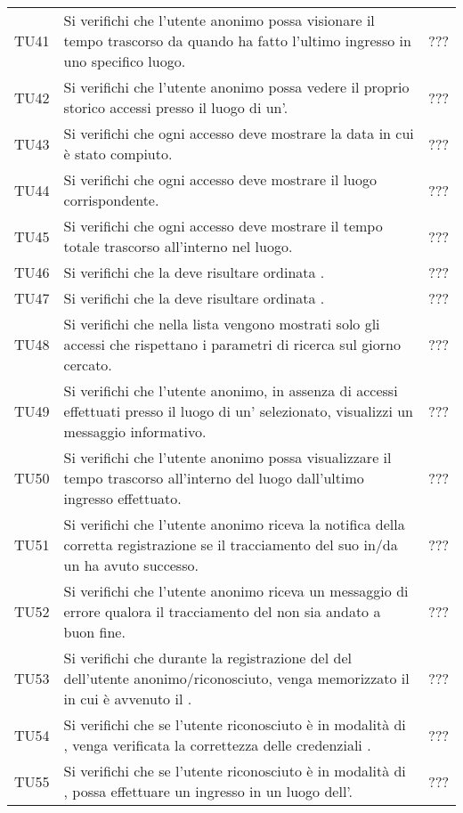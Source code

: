 {\begin{longtable}{ c C{13cm} C{1cm}}
TU41 & Si verifichi che l’utente anonimo possa visionare il tempo trascorso da quando ha fatto l'ultimo ingresso in uno specifico luogo. & ??? \\
TU42 & Si verifichi che l'utente anonimo possa vedere il proprio storico accessi presso il luogo di un'. & ??? \\
TU43 & Si verifichi che ogni accesso deve mostrare la data in cui è stato compiuto. & ??? \\
TU44 & Si verifichi che ogni accesso deve mostrare il luogo corrispondente. & ??? \\
TU45 & Si verifichi che ogni accesso deve mostrare il tempo totale trascorso all'interno nel luogo. & ??? \\
TU46 & Si verifichi che la  deve risultare ordinata . & ??? \\
TU47 & Si verifichi che la  deve risultare ordinata . & ??? \\
TU48 & Si verifichi che nella lista vengono mostrati solo gli accessi che rispettano i parametri di ricerca sul giorno cercato. & ??? \\
TU49 & Si verifichi che l'utente anonimo, in assenza di accessi effettuati presso il luogo di un' selezionato, visualizzi un messaggio informativo. & ??? \\
TU50 & Si verifichi che l'utente anonimo possa visualizzare il tempo trascorso all'interno del luogo dall'ultimo ingresso effettuato. & ??? \\
TU51 & Si verifichi che l’utente anonimo riceva la notifica della corretta registrazione se il tracciamento del suo  in/da un  ha avuto successo. & ??? \\
TU52 & Si verifichi che l’utente anonimo riceva un messaggio di errore qualora il tracciamento del  non sia andato a buon fine. & ??? \\
TU53 & Si verifichi che durante la registrazione del  del  dell'utente anonimo/riconosciuto, venga memorizzato il  in cui è avvenuto il . & ??? \\
TU54 & Si verifichi che se l'utente riconosciuto è in modalità di , venga verificata la correttezza delle credenziali . & ??? \\
TU55 & Si verifichi che se l'utente riconosciuto è in modalità di , possa effettuare un ingresso in un luogo dell'. & ??? \\

\end{longtable}}
